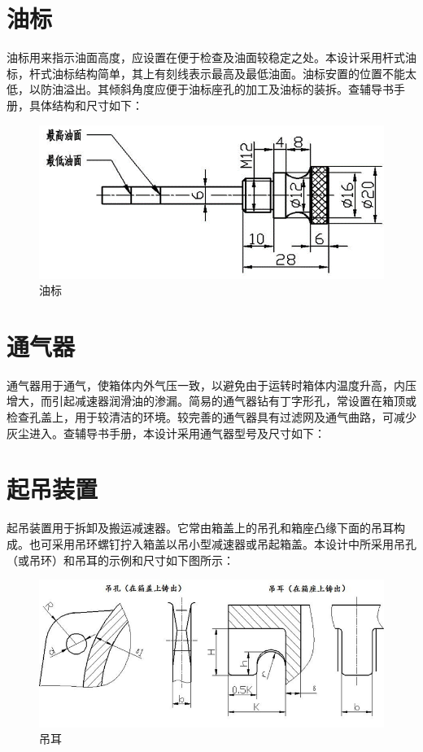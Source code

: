 \documentclass[UTF8,11pt,a4paper,oneside,final,zihao=-4,]{ctexrep}%
\begin{document}
	
	\section{油标}
	{油标用来指示油面高度，应设置在便于检查及油面较稳定之处。本设计采用杆式油标，杆式油标结构简单，其上有刻线表示最高及最低油面。油标安置的位置不能太低，以防油溢出。其倾斜角度应便于油标座孔的加工及油标的装拆。查辅导书手册，具体结构和尺寸如下：}
	\begin{figure}[h!]
		\centering
		\includegraphics[width=0.7\linewidth]{photos/油标}
		\caption{油标}
		\label{fig:}
	\end{figure}
	
	
	\section{通气器}
	{通气器用于通气，使箱体内外气压一致，以避免由于运转时箱体内温度升高，内压增大，而引起减速器润滑油的渗漏。简易的通气器钻有丁字形孔，常设置在箱顶或检查孔盖上，用于较清洁的环境。较完善的通气器具有过滤网及通气曲路，可减少灰尘进入。查辅导书手册，本设计采用通气器型号及尺寸如下：}
	
	\section{起吊装置}
	{起吊装置用于拆卸及搬运减速器。它常由箱盖上的吊孔和箱座凸缘下面的吊耳构成。也可采用吊环螺钉拧入箱盖以吊小型减速器或吊起箱盖。本设计中所采用吊孔（或吊环）和吊耳的示例和尺寸如下图所示：}
	\begin{figure}[h!]
		\centering
		\includegraphics[width=0.7\linewidth]{photos/吊耳}
		\caption{吊耳}
		\label{fig:}
	\end{figure}
	
\end{document}
